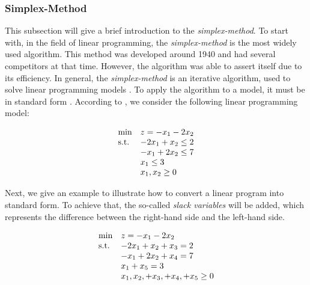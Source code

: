 \subsubsection{Simplex-Method}
This subsection will give a brief introduction to the \textit{simplex-method}. 
To start with, in the field of linear programming, the \textit{simplex-method} 
is the most widely used algorithm. 
This method was developed around 1940 and had several competitors at that time.
However, the algorithm was able to assert itself due to its efficiency. 
In general, the \textit{simplex-method} is an iterative algorithm, used to solve 
linear programming models . To apply the algorithm to a model, 
it must be in standard form . According to , 
we consider the following linear programming model:

\begin{equation*}
    \begin{array}{ll@{}ll}
        \text{min}  & \displaystyle z = -x_{1} - 2x_{2} &\\
        \text{s.t.}& \displaystyle - 2x_{1} + x_{2} \leq 2 &\\
                    & \displaystyle - x_{1} + 2x_{2} \leq 7 &\\
                    & \displaystyle  x_{1} \leq 3 &\\
                    &                        x_{1}, x_{2} \geq 0
    \end{array}
\end{equation*}

Next, we give an example to illustrate how to convert a linear program into standard form.
To achieve that, the so-called \textit{slack variables} will be added, which represents the 
difference between the right-hand side and the left-hand side. 

\begin{equation*}
    \begin{array}{ll@{}ll}
        \text{min}  & \displaystyle z = -x_{1} - 2x_{2} &\\
        \text{s.t.}& \displaystyle - 2x_{1} + x_{2} + x_{3} = 2 &\\
                    & \displaystyle - x_{1} + 2x_{2} + x_{4} = 7 &\\
                    & \displaystyle  x_{1} + x_{5} = 3 &\\
                    &                        x_{1}, x_{2}, + x_{3}, + x_{4}, + x_{5} \geq 0
    \end{array}
\end{equation*}


